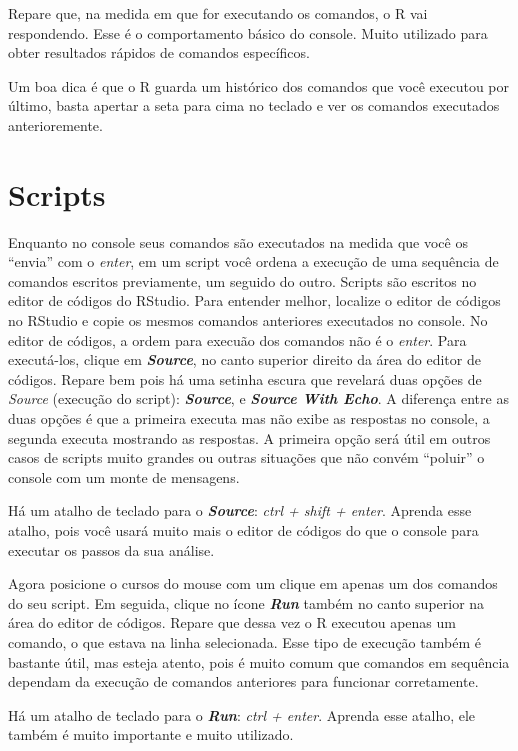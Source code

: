 \documentclass[]{book}
\begin{document}
Repare que, na medida em que for executando os comandos, o R vai
respondendo. Esse é o comportamento básico do console. Muito utilizado
para obter resultados rápidos de comandos específicos.

Um boa dica é que o R guarda um histórico dos comandos que você executou
por último, basta apertar a seta para cima no teclado e ver os comandos
executados anterioremente.

\section{Scripts}\label{scripts}

Enquanto no console seus comandos são executados na medida que você os
``envia'' com o \emph{enter}, em um script você ordena a execução de uma
sequência de comandos escritos previamente, um seguido do outro. Scripts
são escritos no editor de códigos do RStudio. Para entender melhor,
localize o editor de códigos no RStudio e copie os mesmos comandos
anteriores executados no console. No editor de códigos, a ordem para
execuão dos comandos não é o \emph{enter}. Para executá-los, clique em
\textbf{\emph{Source}}, no canto superior direito da área do editor de
códigos. Repare bem pois há uma setinha escura que revelará duas opções
de \emph{Source} (execução do script): \textbf{\emph{Source}}, e
\textbf{\emph{Source With Echo}}. A diferença entre as duas opções é que
a primeira executa mas não exibe as respostas no console, a segunda
executa mostrando as respostas. A primeira opção será útil em outros
casos de scripts muito grandes ou outras situações que não convém
``poluir'' o console com um monte de mensagens.

Há um atalho de teclado para o \textbf{\emph{Source}}: \emph{ctrl +
shift + enter}. Aprenda esse atalho, pois você usará muito mais o editor
de códigos do que o console para executar os passos da sua análise.

Agora posicione o cursos do mouse com um clique em apenas um dos
comandos do seu script. Em seguida, clique no ícone \textbf{\emph{Run}}
também no canto superior na área do editor de códigos. Repare que dessa
vez o R executou apenas um comando, o que estava na linha selecionada.
Esse tipo de execução também é bastante útil, mas esteja atento, pois é
muito comum que comandos em sequência dependam da execução de comandos
anteriores para funcionar corretamente.

Há um atalho de teclado para o \textbf{\emph{Run}}: \emph{ctrl + enter}.
Aprenda esse atalho, ele também é muito importante e muito utilizado.
\end{document}
